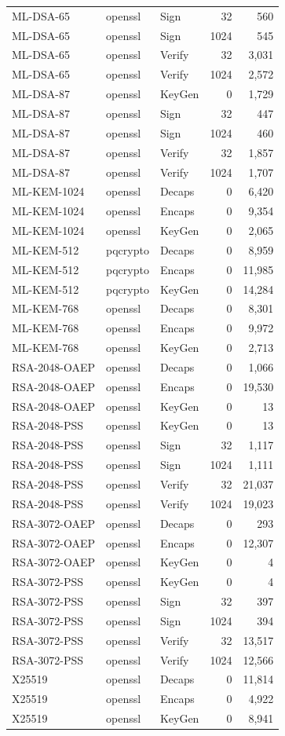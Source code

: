 \begin{table}[ht]
\begin{tabular}{@{}lllrr@{}}
ML-DSA-65 & openssl & Sign & 32 & 560 \\
ML-DSA-65 & openssl & Sign & 1024 & 545 \\
ML-DSA-65 & openssl & Verify & 32 & 3,031 \\
ML-DSA-65 & openssl & Verify & 1024 & 2,572 \\
ML-DSA-87 & openssl & KeyGen & 0 & 1,729 \\
ML-DSA-87 & openssl & Sign & 32 & 447 \\
ML-DSA-87 & openssl & Sign & 1024 & 460 \\
ML-DSA-87 & openssl & Verify & 32 & 1,857 \\
ML-DSA-87 & openssl & Verify & 1024 & 1,707 \\
ML-KEM-1024 & openssl & Decaps & 0 & 6,420 \\
ML-KEM-1024 & openssl & Encaps & 0 & 9,354 \\
ML-KEM-1024 & openssl & KeyGen & 0 & 2,065 \\
ML-KEM-512 & pqcrypto & Decaps & 0 & 8,959 \\
ML-KEM-512 & pqcrypto & Encaps & 0 & 11,985 \\
ML-KEM-512 & pqcrypto & KeyGen & 0 & 14,284 \\
ML-KEM-768 & openssl & Decaps & 0 & 8,301 \\
ML-KEM-768 & openssl & Encaps & 0 & 9,972 \\
ML-KEM-768 & openssl & KeyGen & 0 & 2,713 \\
RSA-2048-OAEP & openssl & Decaps & 0 & 1,066 \\
RSA-2048-OAEP & openssl & Encaps & 0 & 19,530 \\
RSA-2048-OAEP & openssl & KeyGen & 0 & 13 \\
RSA-2048-PSS & openssl & KeyGen & 0 & 13 \\
RSA-2048-PSS & openssl & Sign & 32 & 1,117 \\
RSA-2048-PSS & openssl & Sign & 1024 & 1,111 \\
RSA-2048-PSS & openssl & Verify & 32 & 21,037 \\
RSA-2048-PSS & openssl & Verify & 1024 & 19,023 \\
RSA-3072-OAEP & openssl & Decaps & 0 & 293 \\
RSA-3072-OAEP & openssl & Encaps & 0 & 12,307 \\
RSA-3072-OAEP & openssl & KeyGen & 0 & 4 \\
RSA-3072-PSS & openssl & KeyGen & 0 & 4 \\
RSA-3072-PSS & openssl & Sign & 32 & 397 \\
RSA-3072-PSS & openssl & Sign & 1024 & 394 \\
RSA-3072-PSS & openssl & Verify & 32 & 13,517 \\
RSA-3072-PSS & openssl & Verify & 1024 & 12,566 \\
X25519 & openssl & Decaps & 0 & 11,814 \\
X25519 & openssl & Encaps & 0 & 4,922 \\
X25519 & openssl & KeyGen & 0 & 8,941 \\
\bottomrule
\end{tabular}
\end{table}
